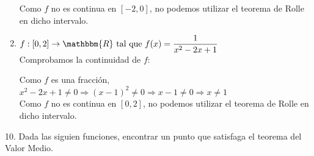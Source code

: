 \documentclass[12pt]{article}
\begin{document}
\begin{enumerate}[\hspace{9px} a)]
        Como $f$ no es continua en $[-2,0]$, no podemos utilizar el teorema de Rolle en dicho intervalo.\\

    \item \(f: [0,2] \rightarrow \mathbbm{R} \ \text{tal que} \ f(x)=\displaystyle\frac{1}{x^2-2x+1}\)\\

        Comprobamos la continuidad de $f$:

        Como $f$ es una fracción, \(x^2-2x+1 \neq 0 \Rightarrow (x-1)^2 \neq 0 \Rightarrow x-1\neq0 \Rightarrow x\neq1\)\\

        Como $f$ no es continua en $[0,2]$, no podemos utilizar el teorema de Rolle en dicho intervalo.\\

\end{enumerate}

10. Dada las siguien funciones, encontrar un punto que satisfaga el teorema del Valor Medio.
\end{document}

